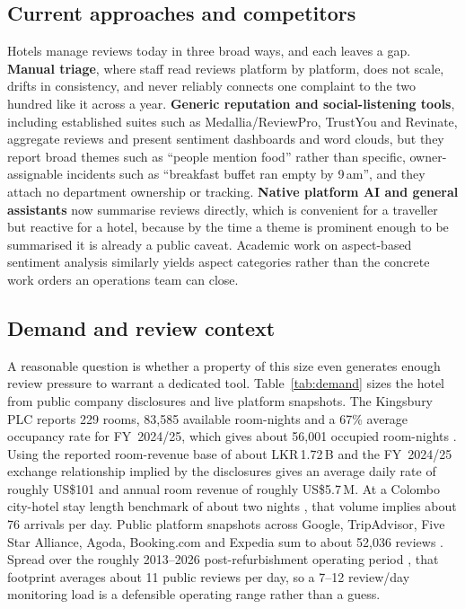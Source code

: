 \documentclass[11pt,a4paper]{article}
\begin{document}
\subsection{Current approaches and competitors}
Hotels manage reviews today in three broad ways, and each leaves a gap. \textbf{Manual triage}, where
staff read reviews platform by platform, does not scale, drifts in consistency, and never reliably
connects one complaint to the two hundred like it across a year. \textbf{Generic reputation and
social-listening tools}, including established suites such as Medallia/ReviewPro, TrustYou and Revinate,
aggregate reviews and present sentiment dashboards and word clouds, but they report broad themes such as
``people mention food'' rather than specific, owner-assignable incidents such as ``breakfast buffet ran
empty by 9\,am'', and they attach no department ownership or tracking. \textbf{Native platform AI and
general assistants} now summarise reviews directly, which is convenient for a traveller but reactive for
a hotel, because by the time a theme is prominent enough to be summarised it is already a public caveat.
Academic work on aspect-based sentiment analysis \citep{pontiki2016semeval} similarly yields aspect
categories rather than the concrete work orders an operations team can close.

\subsection{Demand and review context}
\label{sec:demand}
A reasonable question is whether a property of this size even generates enough review pressure to
warrant a dedicated tool. Table~\ref{tab:demand} sizes the hotel from public company disclosures and
live platform snapshots. The Kingsbury PLC reports 229 rooms, 83{,}585 available room-nights and a 67\%
average occupancy rate for FY~2024/25, which gives about 56{,}001 occupied room-nights
\citep{kingsbury2025annual}. Using the reported room-revenue base of about LKR\,1.72\,B and the
FY~2024/25 exchange relationship implied by the disclosures gives an average daily rate of roughly
US\$101 and annual room revenue of roughly US\$5.7\,M. At a Colombo city-hotel stay length benchmark of
about two nights \citep{firstcapital2025tourism}, that volume implies about 76 arrivals per day. Public
platform snapshots across Google, TripAdvisor, Five Star Alliance, Agoda, Booking.com and Expedia sum to
about 52{,}036 reviews \citep{kingsburyGoogle2026,kingsburyTripadvisor2026,kingsburyFivestar2026,kingsburyAgoda2026,kingsburyBooking2026,kingsburyExpedia2026}. Spread over the roughly 2013--2026 post-refurbishment operating period \citep{kingsbury2025annual}, that footprint averages about 11 public reviews per day, so a 7--12 review/day monitoring load is a defensible operating range rather than a guess.
\end{document}
